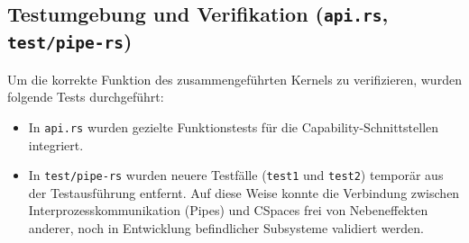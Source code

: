 \subsection{Testumgebung und Verifikation (\texttt{api.rs}, \texttt{test/pipe-rs})}

Um die korrekte Funktion des zusammengeführten Kernels zu verifizieren, wurden folgende Tests durchgeführt:

\begin{itemize}
    \item In \texttt{api.rs} wurden gezielte Funktionstests für die Capability-Schnittstellen integriert.
    \item In \texttt{test/pipe-rs} wurden neuere Testfälle (\texttt{test1} und \texttt{test2}) temporär aus der Testausführung entfernt. Auf diese Weise konnte die Verbindung zwischen Interprozesskommunikation (Pipes) und CSpaces frei von Nebeneffekten anderer, noch in Entwicklung befindlicher Subsysteme validiert werden.
\end{itemize}